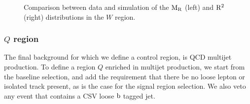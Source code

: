 % 
\begin{figure}[htbp]
\centering
\caption{Comparison between data and simulation of the $\mathrm{M_R}$ (left) and $\mathrm{R^2}$ (right)
distributions in the $W$ region.
\label{fig:DataMC_WRegion_MR_R2_mdphig0p5}}
\end{figure}
% 
% 
% 
% 
% 


\subsubsection{\texorpdfstring{$Q$}{Q} region}

The final background for which we define a control region, is QCD multijet production.
To define a region $Q$ enriched in multijet production, we start from the baseline selection, and
add the requirement that there be no loose lepton or isolated track present, as is the case for the
signal region selection. We also veto any event that contains a CSV loose $\mathrm{b}$ tagged jet. 

